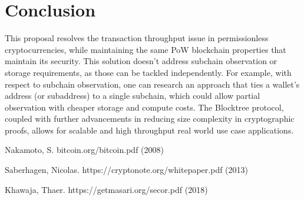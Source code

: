 \documentclass{article}
\begin{document}
\section{Conclusion}
This proposal resolves the transaction throughput issue in permissionless cryptocurrencies, while maintaining the same PoW blockchain properties that maintain its security. This solution doesn't address subchain observation or storage requirements, as those can be tackled independently. For example, with respect to subchain observation, one can research an approach that ties a wallet's address (or subaddress) to a single subchain, which could allow partial observation with cheaper storage and compute costs. The Blocktree protocol, coupled with further advancements in reducing size complexity in cryptographic proofs, allows for scalable and high throughput real world use case applications.

\begin{thebibliography}{999}
  Nakamoto, S.
  \newblock bitcoin.org/bitcoin.pdf (2008)

  Saberhagen, Nicolas.
  \newblock https://cryptonote.org/whitepaper.pdf (2013)

  Khawaja, Thaer.
  \newblock https://getmasari.org/secor.pdf (2018)
\end{thebibliography}
\end{document}
